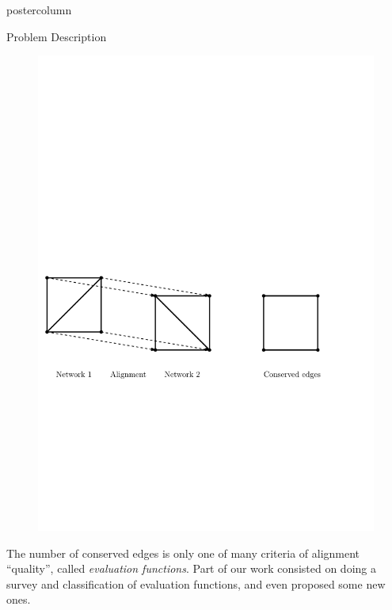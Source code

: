 \documentclass[final,hyperref={pdfpagelabels=false}]{beamer}
\begin{document}
\begin{frame}
\begin{columns}
\begin{column}{.49\textwidth}
\begin{beamercolorbox}[center,wd=\textwidth]{postercolumn}
\begin{minipage}[T]{.95\textwidth}
{\begin{block}{Problem Description}
\begin{figure}
\centering
\includegraphics[width=0.9\linewidth]{../figures/conservededges}
\label{fig:conservededges}
\end{figure}

The number of conserved edges is only one of many criteria of alignment ``quality'', called \textit{evaluation functions}. Part of our work consisted on doing a survey and classification of evaluation functions, and even proposed some new ones.
            \end{block}
          }
        \end{minipage}
      \end{beamercolorbox}
    \end{column}


\end{columns}
\end{frame}
\end{document}
